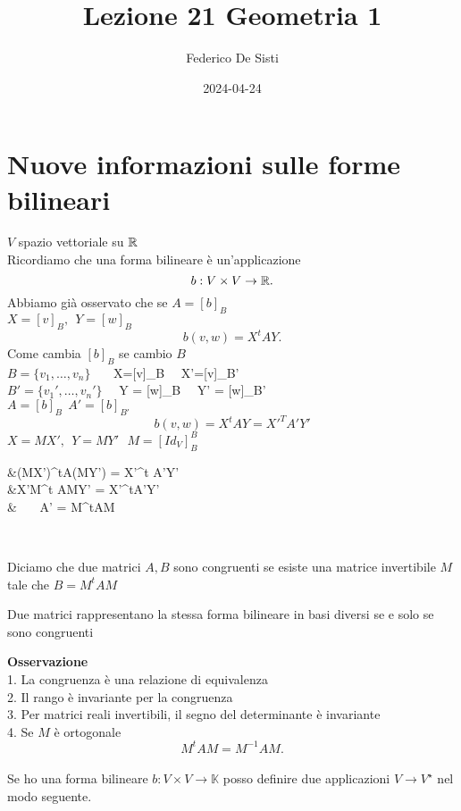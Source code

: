 \documentclass[12px]{article}
\title{Lezione 21 Geometria 1}
\date{2024-04-24}
\author{Federico De Sisti}
\begin{document}
	\maketitle
	\newpage
	\section{Nuove informazioni sulle forme bilineari}
	$V$ spazio vettoriale su $\mathbb{R}$ \\
	Ricordiamo che una forma bilineare è un'applicazione 
	\[
	b:V\times V \rightarrow \mathbb{R}
	.\] 
	Abbiamo già osservato che se $A = [b]_B$\\
	$X = [v]_B, \ \ Y=[w]_B$
	 \[
	b(v,w) = X^tAY
	.\] 
	Come cambia $[b]_B$ se cambio $B$ \\
	$B = \{v_1,\ldots,v_n\}$ \ \ \  X=[v]_B \ \ X'=[v]_B'\\
	$B' = \{v_1',\ldots,v_n'\}$ \ \ Y = [w]_B \ \ Y' = [w]_B'\\
	$A = [b]_B \ \ A' = [b]_{B'}$\\
	$$b(v,w) = X^tAY = X'^TA'Y'$$
	$X = MX', \ \ Y=MY'\ \ \ M = [Id_V]_B^B$\\
	 \begin{aligend}
		 \hspace{80px} &(MX')^tA(MY') = X'^t A'Y'\\
		 &X'M^t AMY' = X'^tA'Y'\\
		 & \ \ \ A' = M^tAM
	 \end{aligend}\\
\begin{defi}
	Diciamo che due matrici $A,B$ sono congruenti se esiste una matrice invertibile $M$ tale che  $B = M^tAM$
\end{defi}
\begin{prop}
	Due matrici rappresentano la stessa forma bilineare in basi diversi se e solo se sono congruenti
\end{prop}
\textbf{Osservazione}\\
1. La congruenza è una relazione di equivalenza\\
2. Il rango è invariante per la congruenza\\
3. Per matrici reali invertibili, il segno del determinante è invariante\\
4. Se $M$ è ortogonale\\
\[
	M^tAM = M^{-1}AM
.\] 
\hline \ \\
Se ho una forma bilineare $b:V\times V \rightarrow \mathbb{K}$ posso definire due applicazioni $V \rightarrow V^\star$ nel modo seguente.\\
\end{document}
